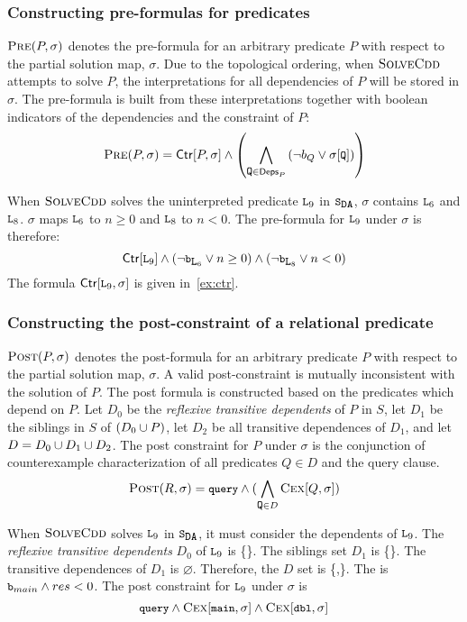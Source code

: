 \subsubsection{Constructing pre-formulas for predicates}
\label{sec:cons-pre}
%
$\textsc{Pre}(P, \sigma)$ denotes the pre-formula for an arbitrary predicate $P$
with respect to the partial solution map, $\sigma$.
%
Due to the topological ordering, when $\textsc{SolveCdd}$ attempts to solve $P$, the
interpretations for all dependencies of $P$ will be stored in
$\sigma$.
%
The pre-formula is built from these interpretations together with boolean
indicators of the dependencies and the constraint of $P$:
%
\[
\prectr(P,\sigma) =
  \ctrof{P,\sigma} \land
    \left(
      \bigland_{\cc{Q} \in \depsof{P}}
      \left(\neg b_Q \lor \sigma[ \cc{Q} ]  \right)
    \right)
\]
%
\begin{ex}
  \label{ex:pre-ctr}
  When $\textsc{SolveCdd}$ solves the uninterpreted predicate $\cc{L}_9$ in $\mcchc$,
  $\sigma$ contains $\cc{L}_6$ and $\cc{L}_8$.
  $\sigma$ maps $\cc{L}_6$ to $n \ge 0$ and $\cc{L}_8$ to $n < 0$.
  The pre-formula for $\cc{L}_9$ under $\sigma$ is therefore:
  $$\ctrof{\cc{L}_9}
  \land (\neg \cc{b}_{\cc{L}_6} \lor n \ge 0) \land (\neg \cc{b}_{\cc{L}_8}
  \lor n < 0)$$
  The formula $\ctrof{\cc{L}_9,\sigma}$ is given in~\autoref{ex:ctr}.
\end{ex}

\subsubsection{Constructing the post-constraint of a relational
  predicate}
\label{sec:cons-post}
$\textsc{Post}(P, \sigma)$ denotes the post-formula for an arbitrary predicate $P$
with respect to the partial solution map, $\sigma$. A valid post-constraint is
mutually inconsistent with the solution of $P$.
%
The post formula is constructed based on the predicates which depend on $P$.
%
Let $D_0$ be the \emph{reflexive transitive dependents} of $P$ in $S$,
let $D_1$ be the siblings in $S$ of $(D_0 \cup {P})$,
%
let $D_2$ be all transitive dependences of $D_1$, and
let $D = D_0 \cup D_1 \cup D_2$.
The post constraint for $P$ under $\sigma$ is the conjunction of counterexample
characterization of all predicates $Q \in D$ and the query clause.
%
\[
\postctr(R, \sigma) =\cc{query} \land (\bigland_{\cc{Q} \in D} \vc{Q,\sigma})
\]
\begin{ex}
  \label{ex:ctx-ctr}
  When $\textsc{SolveCdd}$ solves $\cc{L}_9$ in $\mcchc$, it must consider
  the dependents of $\cc{L}_9$.
  The \emph{reflexive transitive dependents} $D_0$ of $\cc{L}_9$ is \{\}.
  The siblings set $D_1$ is \{\}.
  The transitive dependences of $D_1$ is $\varnothing$. 
  Therefore, the $D$ set is \{,\}.
  The  is $\cc{b}_{main} \land res<0$.
  The post constraint for $\cc{L}_9$ under $\sigma$ is
  $$\cc{query} \land \vc{\cc{main},\sigma} \land \vc{\cc{dbl},\sigma}$$
\end{ex}

